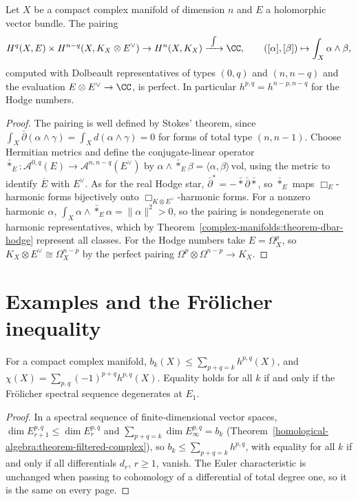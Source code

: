 \begin{theorem}\label{complex-manifolds:theorem-serre-duality}
Let $X$ be a compact complex manifold of dimension $n$ and $E$ a holomorphic vector bundle. The pairing
\[
H^q(X, E) \times H^{n-q}(X, K_X \otimes E^\vee) \to H^n(X, K_X) \xrightarrow{\ \int\ } \CC, \qquad ([\alpha], [\beta]) \mapsto \int_X\alpha \wedge \beta,
\]
computed with Dolbeault representatives of types $(0,q)$ and $(n, n-q)$ and the evaluation $E \otimes E^\vee \to \CC$, is perfect. In particular $h^{p,q} = h^{n-p,n-q}$ for the Hodge numbers.
\end{theorem}

\begin{proof}
The pairing is well defined by Stokes' theorem, since $\int_X\bar\partial(\alpha \wedge \gamma) = \int_Xd(\alpha \wedge \gamma) = 0$ for forms of total type $(n, n-1)$. Choose Hermitian metrics and define the conjugate-linear
operator $\bar*_E \colon \mathcal{A}^{0,q}(E) \to \mathcal{A}^{n,n-q}(E^\vee)$ by $\alpha \wedge \bar*_E\beta = \langle\alpha, \beta\rangle\,\mathrm{vol}$, using the metric to identify $\overline{E}$ with $E^\vee$. As
for the real Hodge star, $\bar\partial^* = -\bar*\bar\partial\bar*$, so $\bar*_E$ maps $\Box_E$-harmonic forms bijectively onto $\Box_{K \otimes E^\vee}$-harmonic forms. For a nonzero harmonic $\alpha$,
$\int_X\alpha \wedge \bar*_E\alpha = \|\alpha\|^2 > 0$, so the pairing is nondegenerate on harmonic representatives, which by Theorem~\ref{complex-manifolds:theorem-dbar-hodge} represent all classes. For the Hodge
numbers take $E = \Omega^p_X$, so $K_X \otimes E^\vee \cong \Omega^{n-p}_X$ by the perfect pairing $\Omega^p \otimes \Omega^{n-p} \to K_X$.
\end{proof}

\section{Examples and the Fr\"olicher inequality}\label{complex-manifolds:section-examples}

\begin{proposition}\label{complex-manifolds:proposition-frolicher-inequality}
For a compact complex manifold, $b_k(X) \leq \sum_{p+q=k}h^{p,q}(X)$, and $\chi(X) = \sum_{p,q}(-1)^{p+q}h^{p,q}(X)$. Equality holds for all $k$ if and only if the Fr\"olicher spectral sequence degenerates at
$E_1$.
\end{proposition}

\begin{proof}
In a spectral sequence of finite-dimensional vector spaces, $\dim E_{r+1}^{p,q} \leq \dim E_r^{p,q}$ and $\sum_{p+q=k}\dim E_\infty^{p,q} = b_k$ (Theorem~\ref{homological-algebra:theorem-filtered-complex}), so
$b_k \leq \sum_{p+q=k}h^{p,q}$, with equality for all $k$ if and only if all differentials $d_r$, $r \geq 1$, vanish. The Euler characteristic is unchanged when passing to cohomology of a differential of
total degree one, so it is the same on every page.
\end{proof}

